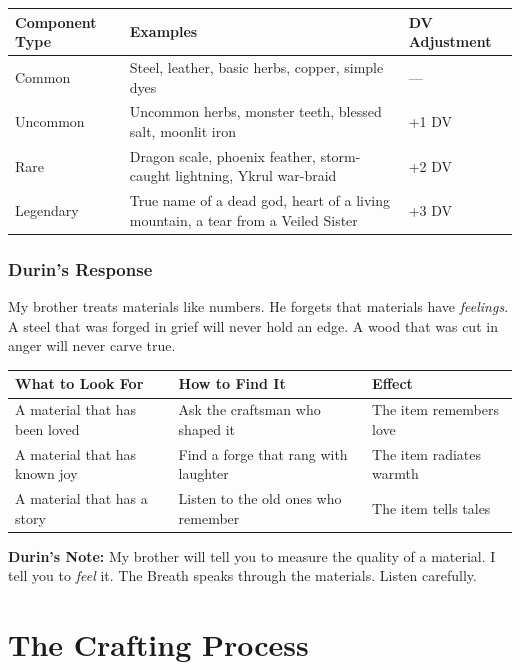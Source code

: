 \documentclass[11pt]{book}
\begin{document}
\begin{table}[h]
\centering
\begin{tabular}{@{}lll@{}}
\toprule
\textbf{Component Type} & \textbf{Examples} & \textbf{DV Adjustment} \\
\midrule
Common & Steel, leather, basic herbs, copper, simple dyes & --- \\
Uncommon & Uncommon herbs, monster teeth, blessed salt, moonlit iron & +1 DV \\
Rare & Dragon scale, phoenix feather, storm-caught lightning, Ykrul war-braid & +2 DV \\
Legendary & True name of a dead god, heart of a living mountain, a tear from a Veiled Sister & +3 DV \\
\bottomrule
\end{tabular}
\end{table}

\subsection*{Durin's Response}

My brother treats materials like numbers. He forgets that materials have \textit{feelings}. A steel that was forged in grief will never hold an edge. A wood that was cut in anger will never carve true.

\begin{table}[h]
\centering
\begin{tabular}{@{}lll@{}}
\toprule
\textbf{What to Look For} & \textbf{How to Find It} & \textbf{Effect} \\
\midrule
A material that has been loved & Ask the craftsman who shaped it & The item remembers love \\
A material that has known joy & Find a forge that rang with laughter & The item radiates warmth \\
A material that has a story & Listen to the old ones who remember & The item tells tales \\
\bottomrule
\end{tabular}
\end{table}

\vspace{0.5cm}
\textbf{Durin's Note:} My brother will tell you to measure the quality of a material. I tell you to \textit{feel} it. The Breath speaks through the materials. Listen carefully.

\newpage
\chapter{The Crafting Process}
\end{document}
